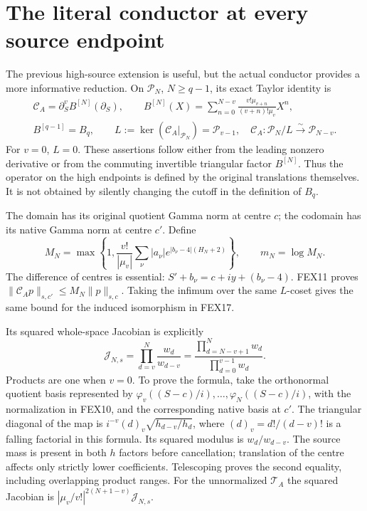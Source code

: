 \documentclass[11pt,a4paper]{article}
\begin{document}
\section{The literal conductor at every source endpoint}
\label{sec:FEX-conductor}
The previous high-source extension is useful, but the actual conductor
provides a more informative reduction. On $\mathcal P_N$, $N\ge q-1$,
its exact Taylor identity is
\[
\begin{gathered}
 \mathcal C_A=\partial_S^v B^{[N]}(\partial_S),\qquad
 B^{[N]}(X)=\sum_{n=0}^{N-v}
       \frac{v!\mu_{v+n}}{(v+n)!\mu_v}X^n,\\
 B^{[q-1]}=B_q,\qquad
 L:=\ker(\mathcal C_A|_{\mathcal P_N})=\mathcal P_{v-1},\quad
 \mathcal C_A:\mathcal P_N/L\xrightarrow{\sim}\mathcal P_{N-v}.
\end{gathered}\tag{FEX17}
\]
For $v=0$, $L=0$. These assertions follow either from the leading
nonzero derivative or from the commuting invertible triangular factor
$B^{[N]}$. Thus the operator on the high endpoints is defined by the
original translations themselves. It is not obtained by silently
changing the cutoff in the definition of $B_q$.

The domain has its original quotient Gamma norm at centre $c$; the
codomain has its native Gamma norm at centre $c'$. Define
\[
 M_N=\max\left\{1,\frac{v!}{|\mu_v|}
       \sum_\nu|a_\nu|e^{|b_\nu-4|(H_N+2)}\right\},\qquad m_N=\log M_N.
 \tag{FEX18}
\]
The difference of centres is essential: $S'+b_\nu=c+iy+(b_\nu-4)$.
FEX11 proves $\|\mathcal C_Ap\|_{s,c'}\le M_N\|p\|_{s,c}$.
Taking the infimum over the same $L$-coset gives the same bound for the
induced isomorphism in FEX17.

Its squared whole-space Jacobian is explicitly
\[
 \boxed{\quad
 \mathscr J_{N,s}
  =\prod_{d=v}^{N}\frac{w_d}{w_{d-v}}
  =\frac{\prod_{d=N-v+1}^{N}w_d}{\prod_{d=0}^{v-1}w_d}.
 \quad}\tag{FEX19}
\]
Products are one when $v=0$. To prove the formula, take the orthonormal
quotient basis represented by $\varphi_v((S-c)/i),\ldots,
\varphi_N((S-c)/i)$, with the normalization in FEX10, and the corresponding
native basis at $c'$. The triangular diagonal of the map is
$i^{-v}(d)_v\sqrt{h_{d-v}/h_d}$, where $(d)_v=d!/(d-v)!$ is a falling
factorial in this formula. Its squared modulus is $w_d/w_{d-v}$.
The source mass is present in both $h$ factors before cancellation;
translation of the centre affects only strictly lower coefficients.
Telescoping proves the second equality, including overlapping product
ranges. For the unnormalized $\mathcal T_A$ the squared Jacobian is
$|\mu_v/v!|^{2(N+1-v)}\mathscr J_{N,s}$.
\end{document}
